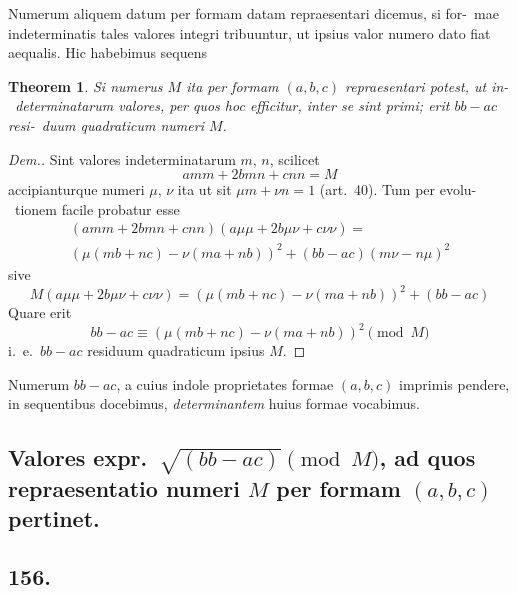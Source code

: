 \documentclass[12pt,a4paper]{article}
\theoremstyle{plain}
\newtheorem{theorem}{Theorem}[section]
\theoremstyle{definition}
\theoremstyle{remark}
\begin{document}
Numerum aliquem datum per formam datam repraesentari dicemus, si for-\ mae indeterminatis tales valores integri tribuuntur, ut ipsius valor numero dato
fiat aequalis. Hic habebimus sequens

\begin{theorem}
Si numerus $M$ ita per formam $(a, b, c)$ repraesentari potest, ut in-\ determinatarum valores, per quos hoc efficitur, inter se sint primi; erit $bb - ac$ resi-\ duum quadraticum numeri $M$.
\end{theorem}

\begin{proof}[Dem.]
Sint valores indeterminatarum $m$, $n$, scilicet
\[
amm + 2bmn + cnn = M
\]
accipianturque numeri $\mu$, $\nu$ ita ut sit $\mu m + \nu n = 1$ (art.~40). Tum per evolu-\ tionem facile probatur esse
\begin{multline*}
(amm + 2bmn + cnn)(a\mu\mu + 2b\mu\nu + c\nu\nu) = \\
(\mu(mb+nc) - \nu(ma+nb))^2 + (bb - ac)(m\nu - n\mu)^2
\end{multline*}
sive
\[
M(a\mu\mu + 2b\mu\nu + c\nu\nu) = (\mu(mb+nc) - \nu(ma+nb))^2 + (bb - ac)
\]
Quare erit
\[
bb - ac \equiv (\mu(mb+nc) - \nu(ma+nb))^2 \pmod{M}
\]
i.~e.\ $bb - ac$ residuum quadraticum ipsius $M$.
\end{proof}

Numerum $bb - ac$, a cuius indole proprietates formae $(a,b,c)$ imprimis
pendere, in sequentibus docebimus, \emph{determinantem} huius formae vocabimus.

\subsection*{Valores expr.\ $\sqrt{(bb-ac)} \pmod{M}$, ad quos repraesentatio numeri $M$ per formam $(a,b,c)$ pertinet.}

\subsection*{156.}
\end{document}
